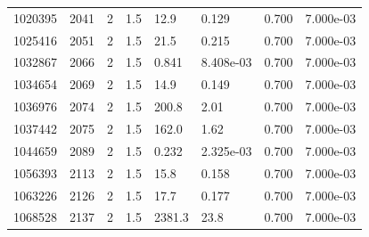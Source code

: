 \documentclass[preview]{standalone}
\begin{document}
{{{{{{{{{{{{{{{\begin{tabular}{L{1.2cm}C{1.2cm} C{0.3cm}C{0.5cm} C{1.4cm}C{1.4cm} C{1.4cm}C{1.4cm}}
  1020395  &  2041  & 2     & 1.5 &  12.9  & 0.129  & 0.700 &  7.000e-03   \\ 
  1025416  &  2051  & 2     & 1.5 &  21.5  & 0.215  & 0.700 &  7.000e-03   \\ 
  1032867  &  2066  & 2     & 1.5 &  0.841  & 8.408e-03  & 0.700 &  7.000e-03   \\ 
  1034654  &  2069  & 2     & 1.5 &  14.9  & 0.149  & 0.700 &  7.000e-03   \\ 
  1036976  &  2074  & 2     & 1.5 &  200.8  & 2.01  & 0.700 &  7.000e-03   \\ 
  1037442  &  2075  & 2     & 1.5 &  162.0  & 1.62  & 0.700 &  7.000e-03   \\ 
  1044659  &  2089  & 2     & 1.5 &  0.232  & 2.325e-03  & 0.700 &  7.000e-03   \\ 
  1056393  &  2113  & 2     & 1.5 &  15.8  & 0.158  & 0.700 &  7.000e-03   \\ 
  1063226  &  2126  & 2     & 1.5 &  17.7  & 0.177  & 0.700 &  7.000e-03   \\ 
  1068528  &  2137  & 2     & 1.5 &  2381.3  & 23.8  & 0.700 &  7.000e-03   \\ 
\hline 
\end{tabular} 

}}}}}}}}}}}}}}}
\end{document}
